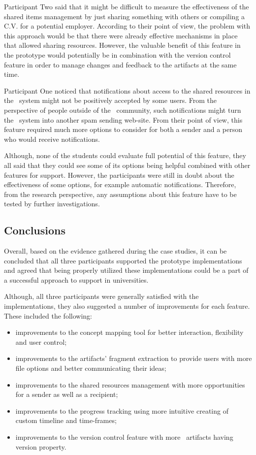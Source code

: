 Participant Two said that it might be difficult to measure the effectiveness
of the shared items management by just sharing something with others or
compiling a C.V. for a potential employer. According to their point of view, the
problem with this approach would be that there were already effective mechanisms
in place that allowed sharing resources. However, the valuable benefit of this
feature in the prototype would potentially be in combination with the version
control feature in order to manage changes and feedback to the artifacts at the
same time.

Participant One noticed that notifications about access to the shared resources
in the \ep~system might not be positively accepted by some users. From the
perspective of people outside of the \ep~community, such notifications might
turn the \ep~system into another spam sending web-site. From their point of
view, this feature required much more options to consider for both a sender and
a person who would receive notifications.

Although, none of the students could evaluate full potential of this feature,
they all said that they could see some of its options being helpful combined
with other features for \LLLs support. However, the participants were still in
doubt about the effectiveness of some options, for example automatic
notifications. Therefore, from the research perspective, any assumptions about
this feature have to be tested by further investigations.

\subsection{Conclusions}

Overall, based on the evidence gathered during the case studies, it can be
concluded that all three participants supported the prototype implementations
and agreed that being properly utilized these implementations could be a part of
a successful approach to \LLLs support in universities.

Although, all three participants were generally satisfied with the
implementations, they also suggested a number of improvements for each
feature. These included the following:

\begin{itemize}
  \item improvements to the concept mapping tool for better interaction,
  flexibility and user control;
  \item improvements to the artifacts' fragment extraction to provide users with
  more file options and better communicating their ideas;
  \item improvements to the shared resources management with more opportunities
  for a sender as well as a recipient; 
  \item improvements to the progress tracking using more intuitive creating of
  custom timeline and time-frames;
  \item improvements to the version control feature with more \ep~artifacts
  having version property.
\end{itemize}

